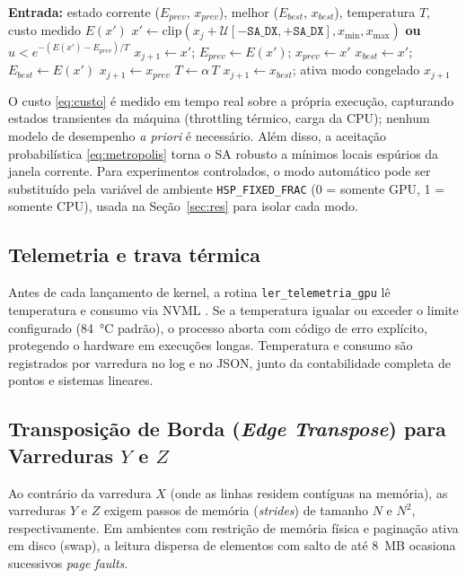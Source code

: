 \documentclass[12pt]{article}
\begin{document}
\begin{algoritmo}[ht]
\centering
\caption{Ciclo de decisão do ajuste dinâmico por simulated annealing
  (executado pelo \emph{dispatcher} a cada janela de \texttt{SA\_WIN}
  blocos).}
\label{alg:sa}
\scriptsize
\begin{algorithmic}[1]
\State \textbf{Entrada:} estado corrente ($E_{prev}$, $x_{prev}$), melhor
        ($E_{best}$, $x_{best}$), temperatura $T$, custo medido $E(x')$
\State $x' \gets \mathrm{clip}(x_j + \mathcal{U}[-\texttt{SA\_DX},+\texttt{SA\_DX}],
       x_{\min}, x_{\max})$ \Comment{\eqref{eq:pertu}}
 \textbf{ou} $u < e^{-(E(x')-E_{prev})/T}$ \Comment{\eqref{eq:metropolis}}
  \State $x_{j+1} \gets x'$; \quad $E_{prev} \gets E(x')$; \quad $x_{prev} \gets x'$
   \State $x_{best} \gets x'$; $E_{best} \gets E(x')$ \EndIf
\Else
  \State $x_{j+1} \gets x_{prev}$ 
\EndIf
\State $T \gets \alpha\,T$ \Comment{\eqref{eq:temp}}
 \State $x_{j+1} \gets x_{best}$; ativa modo congelado \EndIf
\State \Return $x_{j+1}$
\end{algorithmic}
\end{algoritmo}

O custo \eqref{eq:custo} é medido em tempo real sobre a própria execução,
capturando estados transientes da máquina (throttling térmico, carga da CPU);
nenhum modelo de desempenho \emph{a priori} é necessário. Além disso, a
aceitação probabilística \eqref{eq:metropolis} torna o SA robusto a mínimos
locais espúrios da janela corrente. Para experimentos controlados, o modo
automático pode ser substituído pela variável de ambiente
\texttt{HSP\_FIXED\_FRAC} (0 = somente GPU, 1 = somente CPU), usada na
Seção~\ref{sec:res} para isolar cada modo.

\subsection{Telemetria e trava térmica}

Antes de cada lançamento de kernel, a rotina \texttt{ler\_telemetria\_gpu}
lê temperatura e consumo via NVML \cite{nvml:2023}. Se a temperatura igualar ou exceder o
limite configurado (84~°C padrão), o processo aborta com código de erro
explícito, protegendo o hardware em execuções longas. Temperatura e consumo
são registrados por varredura no log e no JSON, junto da contabilidade
completa de pontos e sistemas lineares.

\subsection{Transposição de Borda (\textit{Edge Transpose}) para Varreduras $Y$ e $Z$}
Ao contrário da varredura $X$ (onde as linhas residem contíguas na memória), as varreduras $Y$ e $Z$ exigem passos de memória (\textit{strides}) de tamanho $N$ e $N^2$, respectivamente. Em ambientes com restrição de memória física e paginação ativa em disco (swap), a leitura dispersa de elementos com salto de até 8~MB ocasiona sucessivos \textit{page faults}.
\end{document}
